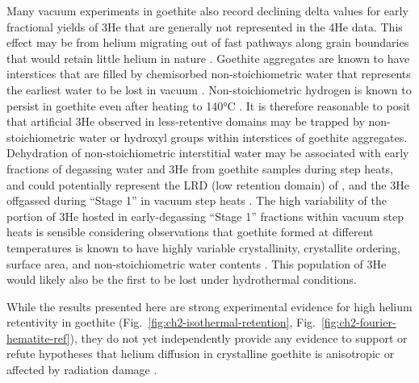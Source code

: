 Many vacuum experiments in goethite also record declining delta values
for early fractional yields of 3He \citep{shustervasconcelos2005,farley2024} that are generally not represented in the 4He data. This effect
may be from helium migrating out of fast pathways along grain boundaries
that would retain little helium in nature \citep{shustervasconcelos2005}.
Goethite aggregates are known to have interstices that are filled by
chemisorbed non-stoichiometric water that represents the earliest water
to be lost in vacuum \citep{naono1987}. Non-stoichiometric hydrogen
is known to persist in goethite even after heating to 140°C \citep{yapppoths1995}. It is therefore reasonable to posit that artificial 3He
observed in less-retentive domains may be trapped by non-stoichiometric
water or hydroxyl groups within interstices of goethite aggregates.
Dehydration of non-stoichiometric interstitial water may be associated
with early fractions of degassing water and 3He from goethite samples
during step heats, and could potentially represent the LRD (low retention
domain) of \citet{shustervasconcelos2005}, and the 3He offgassed during ``Stage
1'' in vacuum step heats \citep{farley2024}. The high variability of
the portion of 3He hosted in early-degassing ``Stage 1'' fractions
within vacuum step heats is sensible considering observations that
goethite formed at different temperatures is known to have highly
variable crystallinity, crystallite ordering, surface area, and
non-stoichiometric water contents \citep{schwertmann1985}. This
population of 3He would likely also be the first to be lost under
hydrothermal conditions.

While the results presented here are strong experimental evidence for
high helium retentivity in goethite (Fig.~\ref{fig:ch2-isothermal-retention}, Fig.~\ref{fig:ch2-fourier-hematite-ref}), they do not yet
independently provide any evidence to support or refute hypotheses that
helium diffusion in crystalline goethite is anisotropic or affected by
radiation damage \citep{bassal2022}.
